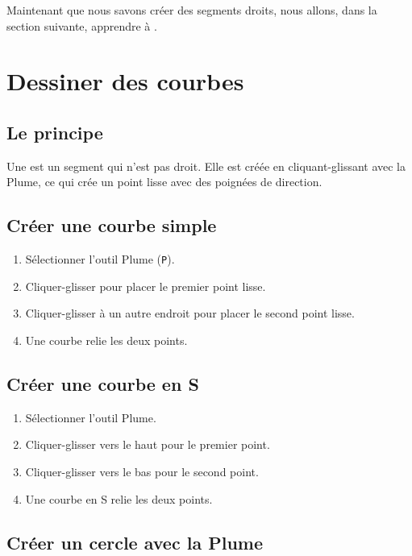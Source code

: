 Maintenant que nous savons créer des segments droits, nous allons, dans la section suivante, apprendre à .

\section{Dessiner des courbes}

\subsection{Le principe}

Une  est un segment qui n'est pas droit. Elle est créée en cliquant-glissant avec la Plume, ce qui crée un point lisse avec des poignées de direction.

\subsection{Créer une courbe simple}

\begin{enumerate}
    \item Sélectionner l'outil Plume (\texttt{P}).
    \item Cliquer-glisser pour placer le premier point lisse.
    \item Cliquer-glisser à un autre endroit pour placer le second point lisse.
    \item Une courbe relie les deux points.
\end{enumerate}

\subsection{Créer une courbe en S}

\begin{enumerate}
    \item Sélectionner l'outil Plume.
    \item Cliquer-glisser vers le haut pour le premier point.
    \item Cliquer-glisser vers le bas pour le second point.
    \item Une courbe en S relie les deux points.
\end{enumerate}

\subsection{Créer un cercle avec la Plume}

